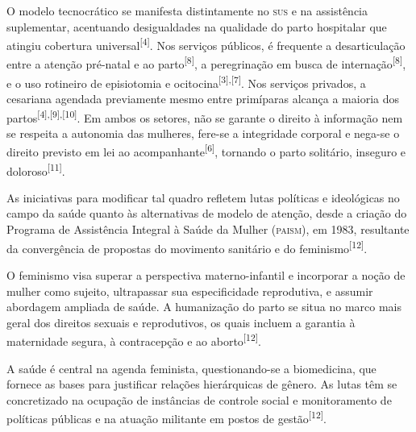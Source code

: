 \documentclass{article}
\begin{document}
O modelo tecnocrático se manifesta distintamente no \textsc{sus} e na assistência
suplementar,
acentuando desigualdades na qualidade do parto hospitalar que atingiu cobertura
universal\textsuperscript{[}\textsuperscript{4}\textsuperscript{]}. Nos serviços públicos, é
frequente a desarticulação entre a atenção pré-natal e ao parto\textsuperscript{[}\textsuperscript{8}\textsuperscript{]}, a peregrinação em busca de internação\textsuperscript{[}\textsuperscript{8}\textsuperscript{]}, e o uso rotineiro de episiotomia e
ocitocina\textsuperscript{[}\textsuperscript{3}\textsuperscript{]}\textsuperscript{,}\textsuperscript{[}\textsuperscript{7}\textsuperscript{]}. Nos serviços privados, a cesariana
agendada previamente mesmo entre primíparas alcança a maioria dos partos\textsuperscript{[}\textsuperscript{4}\textsuperscript{]}\textsuperscript{,}\textsuperscript{[}\textsuperscript{9}\textsuperscript{]}\textsuperscript{,}\textsuperscript{[}\textsuperscript{10}\textsuperscript{]}. Em ambos os setores, não se garante o direito à
informação nem se respeita a autonomia das mulheres, fere-se a integridade
corporal e
nega-se o direito previsto em lei ao acompanhante\textsuperscript{[}\textsuperscript{6}\textsuperscript{]}, tornando o parto solitário, inseguro e doloroso\textsuperscript{[}\textsuperscript{11}\textsuperscript{]}.

As iniciativas para modificar tal quadro refletem lutas políticas e ideológicas
no campo
da saúde quanto às alternativas de modelo de atenção, desde a criação do
Programa de
Assistência Integral à Saúde da Mulher (\textsc{paism}), em 1983, resultante da
convergência de
propostas do movimento sanitário e do feminismo\textsuperscript{[}\textsuperscript{12}\textsuperscript{]}.

O feminismo visa superar a perspectiva materno-infantil e incorporar a noção de
mulher
como sujeito, ultrapassar sua especificidade reprodutiva, e assumir abordagem
ampliada
de saúde. A humanização do parto se situa no marco mais geral dos direitos
sexuais e
reprodutivos, os quais incluem a garantia à maternidade segura, à contracepção e
ao
aborto\textsuperscript{[}\textsuperscript{12}\textsuperscript{]}.

A saúde é central na agenda feminista, questionando-se a biomedicina, que
fornece as
bases para justificar relações hierárquicas de gênero. As lutas têm se
concretizado na
ocupação de instâncias de controle social e monitoramento de políticas públicas
e na
atuação militante em postos de gestão\textsuperscript{[}\textsuperscript{12}\textsuperscript{]}.
\end{document}
